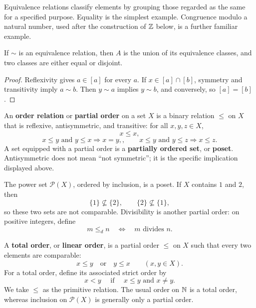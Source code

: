 Equivalence relations classify elements by grouping those regarded as the
same for a specified purpose. Equality is the simplest example. Congruence
modulo a natural number, used after the construction of \(\mathbb{Z}\) below, is a
further familiar example.

\begin{proposition}
\label{prop:equivalence-classes}
If $\sim$ is an equivalence relation, then $A$ is the union of its equivalence classes, and two classes are either equal or disjoint.
\end{proposition}
\begin{proof}
Reflexivity gives $a\in[a]$ for every $a$. If $x\in[a]\cap[b]$, symmetry and transitivity imply $a\sim b$. Then $y\sim a$ implies $y\sim b$, and conversely, so $[a]=[b]$.
\end{proof}

\begin{definition}
An \textbf{order relation} or \textbf{partial order} on a set $X$ is a binary relation \(\leq\) on $X$
that is reflexive, antisymmetric, and transitive: for all $x,y,z\in X$,
\[
x\leq x,
\]
\[
x\leq y\text{ and }y\leq x\Longrightarrow x=y,,\qquad x\leq y\text{ and }y\leq z\Longrightarrow x\leq z.
\]
A set equipped with a partial order is a \textbf{partially ordered set}, or
\textbf{poset}. Antisymmetric does not mean ``not symmetric''; it is the
specific implication displayed above.
\end{definition}

\begin{example}
The power set \(\mathcal P(X)\), ordered by inclusion, is a poset. If $X$
contains $1$ and $2$, then
\[
\{1\}\not\subseteq\{2\},
\qquad
\{2\}\not\subseteq\{1\},
\]
so these two sets are not comparable. Divisibility is another partial order:
on positive integers, define
\[
m\leq_d n
\quad\Longleftrightarrow\quad
m\text{ divides }n.
\]
\end{example}

\begin{definition}
A \textbf{total order}, or \textbf{linear order}, is a partial order
\(\leq\) on $X$ such that every two elements are comparable:
\[
x\leq y\quad\text{or}\quad y\leq x
\qquad(x,y\in X).
\]
For a total order, define its associated strict order by
\[
x<y
\quad\text{ if }\quad
x\leq y\text{ and }x\ne y.
\]
We take \(\leq\) as the primitive relation. The usual order on \(\mathbb{N}\) is a
total order, whereas inclusion on \(\mathcal P(X)\) is generally only a
partial order.
\end{definition}

